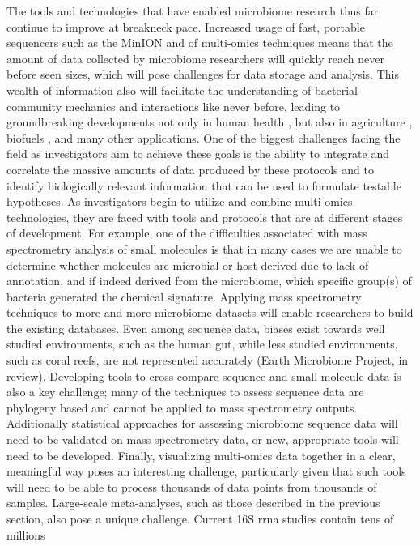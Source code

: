 The tools and technologies that have enabled microbiome research thus far continue
to improve at breakneck pace. Increased usage of fast, portable sequencers such as
the MinION and of multi-omics techniques means that the amount of data collected
by microbiome researchers will quickly reach never before seen sizes, which will
pose challenges for data storage and analysis. This wealth of information also will
facilitate the understanding of bacterial community mechanics and interactions like
never before, leading to groundbreaking developments not only in human health
\cite{VanNood2013, Cox2015, Ling2015}, but also in agriculture \cite{Sessitsch2015},
biofuels \cite{Hess2011}, and many other applications. One of the biggest challenges
facing the field as investigators aim to achieve these goals is the ability to integrate
and correlate the massive amounts of data produced by these protocols and to identify
biologically relevant information that can be used to formulate testable hypotheses.
As investigators begin to utilize and combine multi-omics technologies, they are
faced with tools and protocols that are at different stages of development. For
example, one of the difficulties associated with mass spectrometry analysis of small
molecules is that in many cases we are unable to determine whether molecules are
microbial or host-derived due to lack of annotation, and if indeed derived from
the microbiome, which specific group(s) of bacteria generated the chemical signature.
Applying mass spectrometry techniques to more and more microbiome datasets will enable
researchers to build the existing databases. Even among sequence data, biases exist
towards well studied environments, such as the human gut, while less studied environments,
such as coral reefs, are not represented accurately (Earth Microbiome Project, in
review). Developing tools to cross-compare sequence and small molecule data is also
a key challenge; many of the techniques to assess sequence data are phylogeny based
and cannot be applied to mass spectrometry outputs. Additionally statistical approaches
for assessing microbiome sequence data \cite{Mortone00162-16, Mandal2015} will need to
be validated on mass spectrometry data, or new, appropriate tools will need to be
developed. Finally, visualizing multi-omics data together in a clear, meaningful
way poses an interesting challenge, particularly given that such tools will need
to be able to process thousands of data points from thousands of samples.
Large-scale meta-analyses, such as those described in the previous section, also
pose a unique challenge. Current 16S \gls{rrna} studies contain tens of millions
